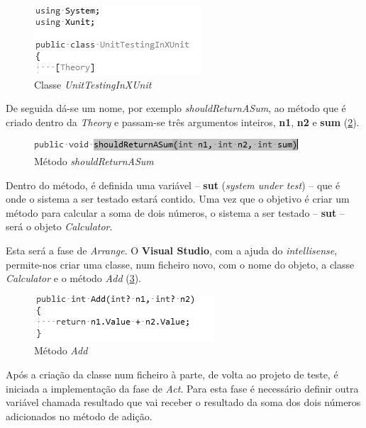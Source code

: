\begin{figure}[hbt!]
\centering
\includegraphics[width=0.4\linewidth]{Cap5/XUnitClass.png}
\caption{Classe \textit{UnitTestingInXUnit}}
\label{Fig:Fig14}
\end{figure}


\hspace{1cm}De seguida dá-se um nome, por exemplo \textit{shouldReturnASum}, ao método que é criado dentro da \textit{Theory} e passam-se três argumentos inteiros, \textbf{n1}, \textbf{n2} e \textbf{sum} (\ref{Fig:Fig15}).

\begin{figure}[hbt!]
\centering
\includegraphics[width=0.6\linewidth]{Cap5/TheoryMethod.png}
\caption{Método \textit{shouldReturnASum}}
\label{Fig:Fig15}
\end{figure}


\hspace{1cm}Dentro do método, é definida uma variável -- \textbf{sut} (\textit{system under test}) -- que é onde o sistema a ser testado estará contido. Uma vez que o objetivo é criar um método para calcular a soma de dois números, o sistema a ser testado -- \textbf{sut} -- será o objeto \textit{Calculator}.

\hspace{1cm}Esta será a fase de \textit{Arrange}. O \textbf{Visual Studio}, com a ajuda do \textit{intellisense}, permite-nos criar uma classe, num ficheiro novo, com o nome do objeto, a classe \textit{Calculator} e o método \textit{Add} (\ref{Fig:Fig16}).

\begin{figure}[hbt!]
\centering
\includegraphics[width=0.4\linewidth]{Cap5/CalculatorClassAddMethod.png}
\caption{Método \textit{Add}}
\label{Fig:Fig16}
\end{figure}

\hspace{1cm}Após a criação da classe num ficheiro à parte, de volta ao projeto de teste, é iniciada a implementação da fase de \textit{Act}. Para esta fase é necessário definir outra variável chamada resultado que vai receber o resultado da soma dos dois números adicionados no método de adição. 


